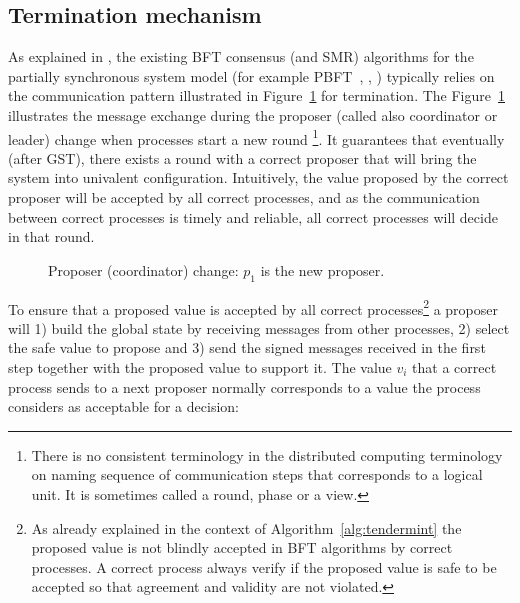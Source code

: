 \subsection{Termination mechanism}

As explained in \cite{MHS09:opodis, RMS10:dsn}, the existing BFT consensus (and SMR) algorithms for the partially synchronous system model (for example PBFT~\cite{CL99:osdi}, \cite{DLS88:jacm}, \cite{MA06:tdsc}) typically relies on the communication pattern illustrated in Figure~\ref{ch3:fig:coordinator-change} for termination. The Figure~\ref{ch3:fig:coordinator-change} illustrates the message exchange during the proposer (called also coordinator or leader) change when processes start a new round \footnote{There is no consistent terminology in the distributed computing terminology on naming sequence of communication steps that corresponds to a logical unit. It is sometimes called a round, phase or a view.}. It guarantees that eventually (after GST), there exists a round with a correct proposer that will bring the system into univalent configuration. Intuitively, the value proposed by the correct proposer will be accepted by all correct processes, and as the communication between correct processes is timely and reliable, all correct processes will decide in that round.   

\begin{figure}[tbh!]
	\def\rdstretch{5}
	\def\ystretch{3}
	\centering
	\begin{rounddiag}{4}{2}
	\end{rounddiag}
	\vspace{-5mm}
	\caption{\boldmath Proposer (coordinator) change: $p_1$ is the new proposer.}
	\label{ch3:fig:coordinator-change}
\end{figure}  

To ensure that a proposed value is accepted by all correct processes\footnote{As already explained in the context of Algorithm~\ref{alg:tendermint} the proposed value is not blindly accepted in BFT algorithms by correct processes. A correct process always verify if the proposed value is safe to be accepted so that agreement and validity are not violated.} a proposer will 1) build the global state by receiving messages from other processes, 2) select the safe value to propose and 3) send the signed messages received in the first step together with the proposed value to support it. The value $v_i$ that a correct process sends to a next proposer normally corresponds to a value the process considers as acceptable for a decision: 


